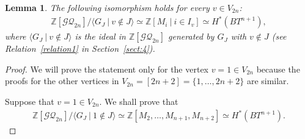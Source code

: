 \documentclass[12pt]{amsart}
\newtheorem{lemma}[theorem]{Lemma}
\theoremstyle{remark}
\numberwithin{equation}{section}
\begin{document}
\begin{lemma}
\label{localization_1st}
The following isomorphism holds for every $v\in V_{2n}$:
\begin{align*}
\mathbb{Z}[\mathcal{GQ}_{2n}]/\langle G_{J}\ |\ v\not\in J \rangle\simeq\mathbb{Z}[M_{i}\ |\ i\in I_{v}]
\simeq H^{*}(BT^{n+1}),
\end{align*}
where $\langle G_{J}\ |\ v\not\in J \rangle$ is the ideal in $\mathbb{Z}[\mathcal{GQ}_{2n}]$ generated by $G_{J}$ with $v\not\in J$ (see Relation~\ref{relation1} in Section~\ref{sect:4}).
\end{lemma}
\begin{proof}
We will prove the statement only for the vertex $v=1\in V_{2n}$ because the proofs for the other vertices in $V_{2n}=[2n+2]=\{1,\ldots, 2n+2\}$ are similar. 

Suppose that $v=1\in V_{2n}$. 
We shall prove that 
\begin{align*}
\mathbb{Z}[\mathcal{GQ}_{2n}]/\langle G_{J}\ |\ 1\not\in J \rangle\simeq 
\mathbb{Z}[M_{2},\ldots, M_{n+1},M_{n+2}]\simeq H^{*}(BT^{n+1}).
\end{align*}


\end{proof}
\end{document}
